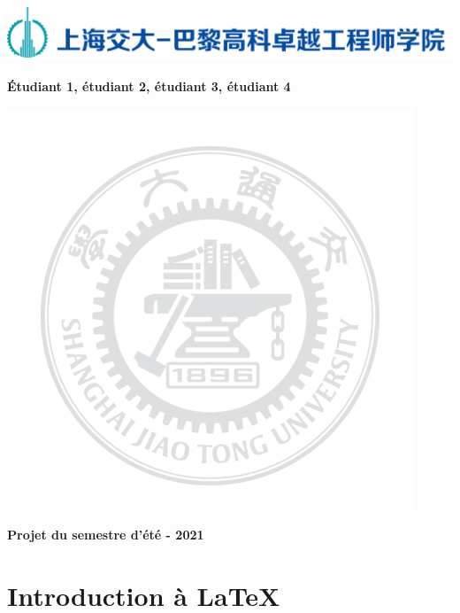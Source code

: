 \documentclass[a4paper,12pt]{article}
\begin{document}
\renewcommand{\labelitemi}{$\blacktriangleright$}
\renewcommand{\labelitemii}{$\bullet$}

\thispagestyle{empty}
\begin{center}
\includegraphics[scale=0.125]{Image/SPEITlogo.png}
\end{center}
%
\vfill
%
\begin{center}
\end{center}
%
\vfill\Large
%
\begin{center}
\textbf{Étudiant 1, étudiant 2, étudiant 3, étudiant 4}
\end{center}
%
\vfill
%
\begin{center}
\includegraphics[scale=1.5]{Image/sjtu2}
\end{center}
%
\vfill
%
\begin{center}
\textbf{Projet du semestre d'été - 2021} 
\end{center}

\clearpage
\thispagestyle{empty}\normalsize
\tableofcontents
\clearpage


\section{Introduction à \LaTeX}
\end{document}
